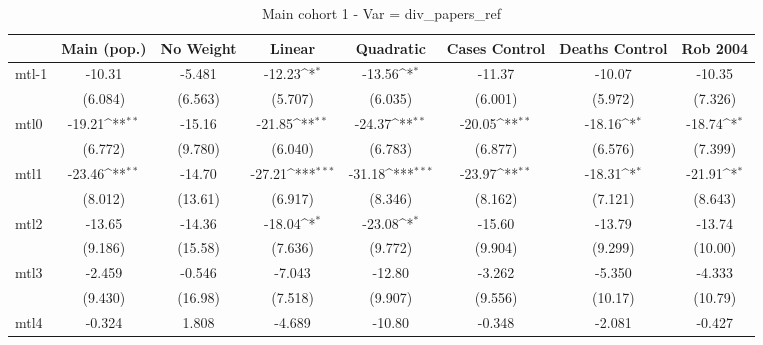 \documentclass{article}
\begin{document}
{
\def\sym#1{\ifmmode^{#1}\else\(^{#1}\)\fi}
\begin{longtable}{l*{7}{c}}
\caption{Main cohort 1 - Var = div\_papers\_ref}\\
\hline\hline\endfirsthead\hline\endhead\hline\endfoot\endlastfoot
                &\multicolumn{1}{c}{Main (pop.)}&\multicolumn{1}{c}{No Weight}&\multicolumn{1}{c}{Linear}&\multicolumn{1}{c}{Quadratic}&\multicolumn{1}{c}{Cases Control}&\multicolumn{1}{c}{Deaths Control}&\multicolumn{1}{c}{Rob 2004}\\
\hline
mtl-1           &   -10.31         &   -5.481         &   -12.23\sym{*}  &   -13.56\sym{*}  &   -11.37         &   -10.07         &   -10.35         \\
                &  (6.084)         &  (6.563)         &  (5.707)         &  (6.035)         &  (6.001)         &  (5.972)         &  (7.326)         \\
mtl0            &   -19.21\sym{**} &   -15.16         &   -21.85\sym{**} &   -24.37\sym{**} &   -20.05\sym{**} &   -18.16\sym{*}  &   -18.74\sym{*}  \\
                &  (6.772)         &  (9.780)         &  (6.040)         &  (6.783)         &  (6.877)         &  (6.576)         &  (7.399)         \\
mtl1            &   -23.46\sym{**} &   -14.70         &   -27.21\sym{***}&   -31.18\sym{***}&   -23.97\sym{**} &   -18.31\sym{*}  &   -21.91\sym{*}  \\
                &  (8.012)         &  (13.61)         &  (6.917)         &  (8.346)         &  (8.162)         &  (7.121)         &  (8.643)         \\
mtl2            &   -13.65         &   -14.36         &   -18.04\sym{*}  &   -23.08\sym{*}  &   -15.60         &   -13.79         &   -13.74         \\
                &  (9.186)         &  (15.58)         &  (7.636)         &  (9.772)         &  (9.904)         &  (9.299)         &  (10.00)         \\
mtl3            &   -2.459         &   -0.546         &   -7.043         &   -12.80         &   -3.262         &   -5.350         &   -4.333         \\
                &  (9.430)         &  (16.98)         &  (7.518)         &  (9.907)         &  (9.556)         &  (10.17)         &  (10.79)         \\
mtl4            &   -0.324         &    1.808         &   -4.689         &   -10.80         &   -0.348         &   -2.081         &   -0.427         \\

\end{longtable}}
\end{document}
